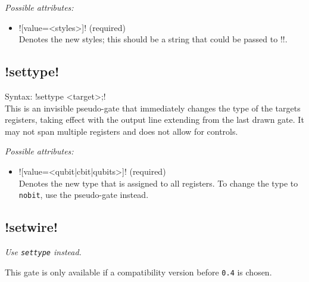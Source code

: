 \documentclass{scrartcl}
\def\ttlink{\link\texttt}
\def\yquantlink{\link\yquant}
\begin{document}
         \emph{Possible attributes:}
         \begin{itemize}
            \item \yquant![value=<styles>]! (required) \\
               Denotes the new styles; this should be a string that could be passed to \tex!\tikzset!.
         \end{itemize}

      \subsection[\texorpdfstring{\yquant{settype}}{settype}]{\yquant!settype!}
         Syntax: \yquant!settype <target>;! \\
         This is an invisible pseudo\hyp gate that immediately changes the type of the targets registers, taking effect with the output line extending from the last drawn gate.
         It may not span multiple registers and does not allow for controls.

         \emph{Possible attributes:}
         \begin{itemize}
            \item \yquant![value=<qubit|cbit|qubits>]! (required) \\
               Denotes the new type that is assigned to all registers.
               To change the type to \ttlink{nobit}, use the \yquantlink{discard} pseudo\hyp gate instead.
         \end{itemize}

      \subsection[\texorpdfstring{\yquant{setwire}}{setwire}]{\yquant!setwire!}
         \emph{Use \ttlink{settype} instead.}

         This gate is only available if a compatibility version before \texttt{0.4} is chosen.
\end{document}
